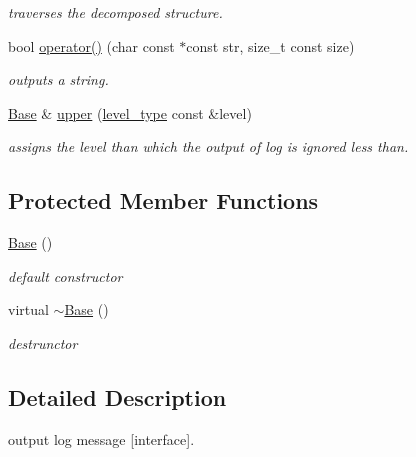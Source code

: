 \begin{DoxyCompactItemize}
\begin{DoxyCompactList}\small\item\em traverses the decomposed structure. \end{DoxyCompactList}\item 
bool \hyperlink{classhryky_1_1log_1_1writer_1_1_base_af3dfcf1de847d720eb7dba2ca9476b4e}{operator()} (char const $\ast$const str, size\-\_\-t const size)
\begin{DoxyCompactList}\small\item\em outputs a string. \end{DoxyCompactList}\item 
\hypertarget{classhryky_1_1log_1_1writer_1_1_base_a802841d14501e525139b9b27c1e9c6f2}{\hyperlink{classhryky_1_1log_1_1writer_1_1_base}{Base} \& \hyperlink{classhryky_1_1log_1_1writer_1_1_base_a802841d14501e525139b9b27c1e9c6f2}{upper} (\hyperlink{classhryky_1_1log_1_1level_1_1_entity}{level\-\_\-type} const \&level)}\label{classhryky_1_1log_1_1writer_1_1_base_a802841d14501e525139b9b27c1e9c6f2}

\begin{DoxyCompactList}\small\item\em assigns the level than which the output of log is ignored less than. \end{DoxyCompactList}\end{DoxyCompactItemize}
\subsection*{Protected Member Functions}
\begin{DoxyCompactItemize}
\item 
\hyperlink{classhryky_1_1log_1_1writer_1_1_base_a5ffe0568374d8b9b4c4ec32953fd6453}{Base} ()
\begin{DoxyCompactList}\small\item\em default constructor \end{DoxyCompactList}\item 
virtual \hyperlink{classhryky_1_1log_1_1writer_1_1_base_a722da881b6c70cfcbde9243abcfbf334}{$\sim$\-Base} ()
\begin{DoxyCompactList}\small\item\em destrunctor \end{DoxyCompactList}\end{DoxyCompactItemize}


\subsection{Detailed Description}
output log message \mbox{[}interface\mbox{]}. 

